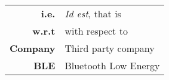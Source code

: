 \begin{center}
    \begin{tabular}{r|l}
        \textbf{i.e.} & \textit{Id est}, that is  \\
        \textbf{w.r.t} & with respect to  \\
        \textbf{Company} & Third party company \\
        \textbf{BLE} & Bluetooth Low Energy \\

    \end{tabular}
\end{center}